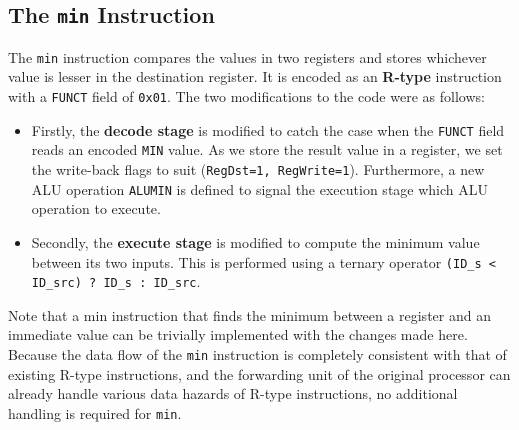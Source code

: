 \documentclass[conference]{IEEEtran}
\begin{document}
\subsection{The \texttt{min} Instruction}
The \texttt{min} instruction compares the values in two registers and stores
whichever value is lesser in the destination register. It is encoded as an
\textbf{R-type} instruction with a \texttt{FUNCT} field of \texttt{0x01}. The
two modifications to the code were as follows:
\begin{itemize}
    \item Firstly, the \textbf{decode stage} is modified to catch the case when
        the \texttt{FUNCT} field reads an encoded \texttt{MIN} value. As we
        store the result value in a register, we set the write-back flags to
        suit (\texttt{RegDst=1, RegWrite=1}). Furthermore, a new ALU operation
        \texttt{ALUMIN} is defined to signal the execution stage which ALU
        operation to execute.
    \item Secondly, the \textbf{execute stage} is modified to compute the
        minimum value between its two inputs. This is performed using a ternary
        operator \texttt{(ID\_s < ID\_src) ? ID\_s : ID\_src}.
\end{itemize}
Note that a min instruction that finds the minimum between a register and an
immediate value can be trivially implemented with the changes made here. Because the data flow of the \texttt{min} instruction is completely consistent with that of existing R-type instructions, and the forwarding unit of the original processor can already handle various data hazards of R-type instructions, no additional handling is required for \texttt{min}.
\end{document}

